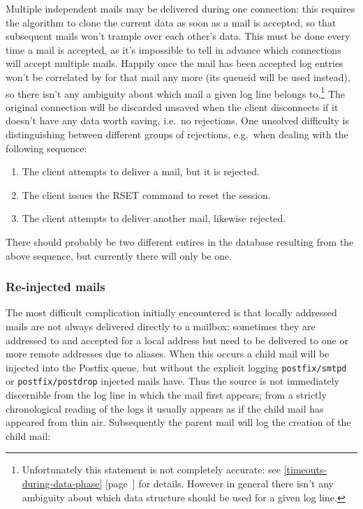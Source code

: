 \documentclass[a4paper,12pt,draft]{article}
\newcommand{\refwithpage}[1]{%
    \empty{}\ref{#1} [page~\pageref{#1}]%
}
\newcommand{\sectionref}[1]{%
    \textsection{}\refwithpage{#1}%
}
\newcommand{\daemon}[1]{%
    \texttt{postfix/#1}%
}
\begin{document}
\label{connection reuse}

Multiple independent mails may be delivered during one connection: this
requires the algorithm to clone the current data as soon as a mail is
accepted, so that subsequent mails won't trample over each other's data.
This must be done every time a mail is accepted, as it's impossible to tell
in advance which connections will accept multiple mails.  Happily once the
mail has been accepted log entries won't be correlated by \pid{} for that
mail any more (its queueid will be used instead), so there isn't any
ambiguity about which mail a given log line belongs
to.\footnote{Unfortunately this statement is not completely accurate: see
\sectionref{timeouts-during-data-phase} for details.  However in general
there isn't any ambiguity about which data structure should be used for a
given log line.}  The original connection will be discarded unsaved when
the client disconnects if it doesn't have any data worth saving, i.e.\ no
rejections.  One unsolved difficulty is distinguishing between different
groups of rejections, e.g.\ when dealing with the following sequence:

\begin{enumerate}

    \item The client attempts to deliver a mail, but it is rejected.

    \item The client issues the RSET command to reset the session.

    \item The client attempts to deliver another mail, likewise rejected.

\end{enumerate}

There should probably be two different entires in the database resulting
from the above sequence, but currently there will only be one.



\subsubsection{Re-injected mails}

The most difficult complication initially encountered is that locally
addressed mails are not always delivered directly to a mailbox: sometimes
they are addressed to and accepted for a local address but need to be
delivered to one or more remote addresses due to aliases.  When this occurs
a child mail will be injected into the Postfix queue, but without the
explicit logging \daemon{smtpd} or \daemon{postdrop} injected mails have.
Thus the source is not immediately discernible from the log line in which
the mail first appears; from a strictly chronological reading of the logs
it usually appears as if the child mail has appeared from thin air.
Subsequently the parent mail will log the creation of the child mail:
\end{document}

